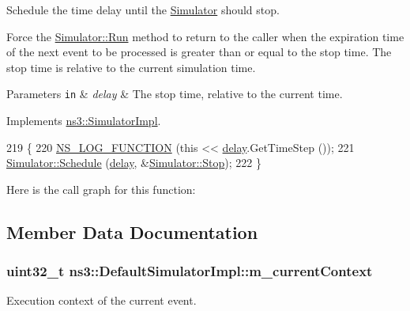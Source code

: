 Schedule the time delay until the \hyperlink{classns3_1_1Simulator}{Simulator} should stop.

Force the \hyperlink{classns3_1_1Simulator_a84be982e6d03b62c3dc3303c75a9b909}{Simulator\+::\+Run} method to return to the caller when the expiration time of the next event to be processed is greater than or equal to the stop time. The stop time is relative to the current simulation time. 
\begin{DoxyParams}[1]{Parameters}
\mbox{\tt in}  & {\em delay} & The stop time, relative to the current time. \\
\hline
\end{DoxyParams}


Implements \hyperlink{classns3_1_1SimulatorImpl_a8cd4ff5659b9f06af3da2897a1fea142}{ns3\+::\+Simulator\+Impl}.


\begin{DoxyCode}
219 \{
220   \hyperlink{log-macros-disabled_8h_a90b90d5bad1f39cb1b64923ea94c0761}{NS\_LOG\_FUNCTION} (\textcolor{keyword}{this} << \hyperlink{lte_2model_2fading-traces_2fading__trace__generator_8m_a7964e6aa8f61a9d28973c8267a606ad8}{delay}.GetTimeStep ());
221   \hyperlink{classns3_1_1Simulator_a671882c894a08af4a5e91181bf1eec13}{Simulator::Schedule} (\hyperlink{lte_2model_2fading-traces_2fading__trace__generator_8m_a7964e6aa8f61a9d28973c8267a606ad8}{delay}, &\hyperlink{classns3_1_1Simulator_a2335ba5b62e9066e893fecb21b7f6afd}{Simulator::Stop});
222 \}
\end{DoxyCode}


Here is the call graph for this function\+:




\subsection{Member Data Documentation}
\subsubsection[{\texorpdfstring{m\+\_\+current\+Context}{m_currentContext}}]{\setlength{\rightskip}{0pt plus 5cm}uint32\+\_\+t ns3\+::\+Default\+Simulator\+Impl\+::m\+\_\+current\+Context\hspace{0.3cm}{\ttfamily [private]}}\hypertarget{classns3_1_1DefaultSimulatorImpl_a16a15129f0af0f7f3a3dd7935164be77}{}\label{classns3_1_1DefaultSimulatorImpl_a16a15129f0af0f7f3a3dd7935164be77}
Execution context of the current event. 
